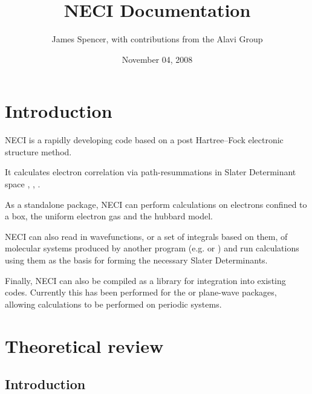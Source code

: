 \documentclass[openany,a4paper,10pt]{manual}
\title{NECI Documentation}
\date{November 04, 2008}
\author{James Spencer, with contributions from the Alavi Group}
\begin{document}
\maketitle
\tableofcontents



\resetcurrentobjects


\hypertarget{introduction}{}\chapter{Introduction}

NECI is a rapidly developing code based on a post Hartree--Fock electronic structure method.

It calculates electron correlation via path-resummations in Slater Determinant space \cite{SumPaper}, \cite{StarPaper}, \cite{ThomPhDThesis}.

As a standalone package, NECI can perform calculations on electrons confined to a box, the uniform electron gas and the hubbard model.

NECI can also read in wavefunctions, or a set of integrals based on them, of molecular systems produced by another program (e.g. \cite{DALTON} or \cite{MolPro}) and run calculations using them as the basis for forming the necessary Slater Determinants.

Finally, NECI can also be compiled as a library for integration into existing codes.  Currently this has been performed for the \cite{CPMD} or \cite{VASP} plane-wave packages, allowing calculations to be performed on periodic systems.

\resetcurrentobjects


\hypertarget{theory-index}{}\chapter{Theoretical review}

\resetcurrentobjects


\hypertarget{theory-introduction}{}\section{Introduction}
\end{document}
